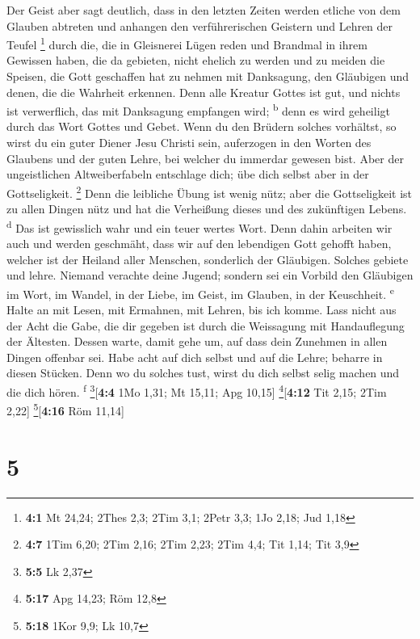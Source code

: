  Der Geist aber sagt deutlich, dass in den letzten Zeiten
werden etliche von dem Glauben abtreten und anhangen den verführerischen
Geistern und Lehren der Teufel \footnote{\textbf{4:1} Mt 24,24; 2Thes
  2,3; 2Tim 3,1; 2Petr 3,3; 1Jo 2,18; Jud 1,18}  durch
die, die in Gleisnerei Lügen reden und Brandmal in ihrem Gewissen haben,
 die da gebieten, nicht ehelich zu werden und zu meiden
die Speisen, die Gott geschaffen hat zu nehmen mit Danksagung, den
Gläubigen und denen, die die Wahrheit erkennen.  Denn alle
Kreatur Gottes ist gut, und nichts ist verwerflich, das mit Danksagung
empfangen wird; \textsuperscript{b}  denn es wird
geheiligt durch das Wort Gottes und Gebet.  Wenn du den
Brüdern solches vorhältst, so wirst du ein guter Diener Jesu Christi
sein, auferzogen in den Worten des Glaubens und der guten Lehre, bei
welcher du immerdar gewesen bist.  Aber der ungeistlichen
Altweiberfabeln entschlage dich; übe dich selbst aber in der
Gottseligkeit. \footnote{\textbf{4:7} 1Tim 6,20; 2Tim 2,16; 2Tim 2,23;
  2Tim 4,4; Tit 1,14; Tit 3,9}  Denn die leibliche Übung
ist wenig nütz; aber die Gottseligkeit ist zu allen Dingen nütz und hat
die Verheißung dieses und des zukünftigen Lebens. \textsuperscript{d}
 Das ist gewisslich wahr und ein teuer wertes Wort.
 Denn dahin arbeiten wir auch und werden geschmäht, dass
wir auf den lebendigen Gott gehofft haben, welcher ist der Heiland aller
Menschen, sonderlich der Gläubigen.  Solches gebiete und
lehre.  Niemand verachte deine Jugend; sondern sei ein
Vorbild den Gläubigen im Wort, im Wandel, in der Liebe, im Geist, im
Glauben, in der Keuschheit. \textsuperscript{e}  Halte an
mit Lesen, mit Ermahnen, mit Lehren, bis ich komme.  Lass
nicht aus der Acht die Gabe, die dir gegeben ist durch die Weissagung
mit Handauflegung der Ältesten.  Dessen warte, damit gehe
um, auf dass dein Zunehmen in allen Dingen offenbar sei. 
Habe acht auf dich selbst und auf die Lehre; beharre in diesen Stücken.
Denn wo du solches tust, wirst du dich selbst selig machen und die dich
hören. \textsuperscript{f} \footnote{\textbf{5:5} Lk 2,37}{[}\textbf{4:4}
1Mo 1,31; Mt 15,11; Apg 10,15{]} \footnote{\textbf{5:17} Apg 14,23; Röm
  12,8}{[}\textbf{4:12} Tit 2,15; 2Tim 2,22{]}
\footnote{\textbf{5:18} 1Kor 9,9; Lk 10,7}{[}\textbf{4:16} Röm 11,14{]}

\hypertarget{section-4}{%
\section{5}\label{section-4}}

